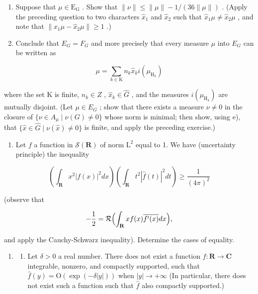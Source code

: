 \begin{enumerate}
\def\labelenumi{\alph{enumi})}
\setcounter{enumi}{4}
\item
  Suppose that \(\mu \in \mathrm{E}_{\mathrm{G}}\) . Show that \(\| \nu \| \leqslant \| \mu \| - 1 / (36 \| \mu \|)\) . (Apply the preceding question to two characters \(\widehat{x}_1\) and \(\widehat{x}_2\) such that \(\widehat{x}_1 \mu \neq \widehat{x}_2 \mu\) , and note that \(\| \widehat{x}_1 \mu - \widehat{x}_2 \mu \| \geqslant 1\) .)
\item
  Conclude that \(E_{G} = F_{G}\) and more precisely that every measure \(\mu\) into \(E_{G}\) can be written as
\end{enumerate}

\[
\mu = \sum_ {k \in \mathrm{K}} n _ {k} \widehat {x} _ {k} i (\mu_ {\mathrm{H} _ {k}})
\]

where the set K is finite, \(n_{k} \in Z\) , \(\widehat{x}_{k} \in \widehat{G}\) , and the measures \(i(\mu_{\mathrm{H}_{k}})\) are mutually disjoint. (Let \(\mu \in E_{G}\) ; show that there exists a measure \(\nu \neq 0\) in the closure of \(\{\nu \in A_{\mu} \mid \nu(G) \neq 0\}\) whose norm is minimal; then show, using e), that \(\{\widehat{x} \in \widehat{G} \mid \nu(\widehat{x}) \neq 0\}\) is finite, and apply the preceding exercise.)

\begin{enumerate}
\def\labelenumi{\arabic{enumi})}
\setcounter{enumi}{26}
\tightlist
\item
  Let \(f\) a function in \(\mathcal{S}(\mathbf{R})\) of norm \(\mathrm{L}^2\) equal to 1. We have (uncertainty principle) the inequality
\end{enumerate}

\[
\left(\int_ {\mathbf {R}} x ^ {2} | f (x) | ^ {2} d x\right) \left(\int_ {\mathbf {R}} t ^ {2} | \widehat {f} (t) | ^ {2} d t\right) \geqslant \frac {1}{(4 \pi) ^ {2}}
\]

(observe that

\[
- \frac {1}{2} = \mathcal {R} \Bigl (\int_ {\mathbf {R}} x f (x) \overline {{f ^ {\prime} (x)}} d x \Bigr),
\]

and apply the Cauchy-Schwarz inequality). Determine the cases of equality.

\begin{enumerate}
\def\labelenumi{\arabic{enumi})}
\setcounter{enumi}{27}
\tightlist
\item
  \begin{enumerate}
  \def\labelenumii{\alph{enumii})}
  \tightlist
  \item
    Let \(\delta > 0\) a real number. There does not exist a function \(f: \mathbf{R} \to \mathbf{C}\) integrable, nonzero, and compactly supported, such that \(\widehat{f}(y) = \mathrm{O}(\exp(-\delta|y|))\) when \(|y| \to +\infty\) (In particular, there does not exist such a function such that \(\widehat{f}\) also compactly supported.)
  \end{enumerate}
\end{enumerate}

